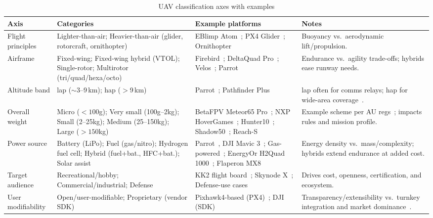 \begin{table}[!t]
  \centering
  \caption{UAV classification axes with examples}
  \label{tab:uav-class-summary}
  \begingroup
  \footnotesize
  \setlength{\tabcolsep}{4pt}
  \setlength{\extrarowheight}{0.4ex}
  \renewcommand{\arraystretch}{1.15}
  \begin{tabularx}{\textwidth}{@{}p{2.4cm} p{4.3cm} p{4.3cm} X@{}}
    \toprule
    \textbf{Axis} & \textbf{Categories} & \textbf{Example platforms} & \textbf{Notes} \\
    \midrule
    Flight principles &
      Lighter-than-air; Heavier-than-air (glider, rotorcraft, ornithopter) &
      EBlimp Atom~\cite{eblimp-atom}; PX4 Glider~\cite{px4-glider}; Ornithopter~\cite{drone-bird} &
      Buoyancy vs.\ aerodynamic lift/propulsion. \\
    Airframe &
      Fixed-wing; Fixed-wing hybrid (VTOL); Single-rotor; Multirotor (tri/quad/hexa/octo) &
      Firebird~\cite{firebirdDrone}; DeltaQuad Pro~\cite{deltaQuadDrone}; Velos~\cite{velosDrone}; Parrot~\cite{parrotDrone} &
      Endurance vs.\ agility trade-offs; hybrids ease runway needs. \\
    Altitude band &
      \gls{lap} (\(\sim\)3–9\,km); \gls{hap} (\(>\)9\,km) &
      Parrot~\cite{parrotDrone}; Pathfinder Plus~\cite{hale-uas}  &
      \gls{lap} often for comms relays; \gls{hap} for wide-area coverage~\cite{mohsan2022towards}. \\
    Overall weight &
      Micro (\(<100\)g); Very small (100g–2kg); Small (2–25kg); Medium (25–150kg); Large (\(>150\)kg) &
      BetaFPV Meteor65 Pro~\cite{micro-uav-fpv}; NXP HoverGames~\cite{nxp-hoverGames-uav};
      Hunter10~\cite{medium-uav}; Shadow50~\cite{medium-uav-2}; Reach-S~\cite{large-uav} &
      Example scheme per AU regs~\cite{alladi2022UAVBlockain}; impacts rules and mission profile. \\
    Power source &
      Battery (LiPo); Fuel (gas/nitro); Hydrogen fuel cell; Hybrid (fuel+bat., HFC+bat.); Solar assist &
      Parrot~\cite{parrotDrone}, DJI Mavic 3~\cite{djiMavic3Drone}; Gas-powered~\cite{gasPoweredDrone}; EnergyOr H2Quad 1000~\cite{energyorDrone}; Flaperon MX8~\cite{flaperonDrone} &
      Energy density vs.\ mass/complexity; hybrids extend endurance at added cost. \\
    Target audience &
      Recreational/hobby; Commercial/industrial; Defense &
      KK2 flight board~\cite{hobbykingKK2}; Skynode X~\cite{skynodeXWebsite}; Defense-use cases~\cite{vxWorks-uav-northrop,skynodeS-noJamming-2,theDriveUAVAccident2019} &
      Drives cost, openness, certification, and ecosystem. \\
    \addlinespace[0.2ex]
    User modifiability &
      Open/user-modifiable; Proprietary (vendor SDK) &
      Pixhawk4-based (PX4)~\cite{osh-uav}; DJI (SDK)~\cite{djiSDK} &
      Transparency/extensibility vs.\ turnkey integration and market dominance~\cite{droneAnalyst2021}. \\
    \bottomrule
  \end{tabularx}
  \endgroup
\end{table}


